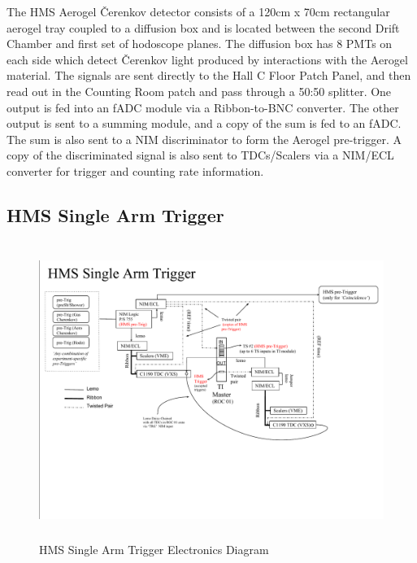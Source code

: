 \documentclass[11pt]{article}
\begin{document}
\indent The HMS Aerogel \v{C}erenkov detector consists of a 120cm x 70cm rectangular aerogel tray coupled to a diffusion box\cite{hms_aero_article} and is located
between the second Drift Chamber and first set of hodoscope planes. The diffusion box has 8 PMTs on each side
which detect \v{C}erenkov light produced by interactions with the Aerogel material. The signals are sent directly to the Hall C Floor Patch Panel, and then
read out in the Counting Room patch and pass through a 50:50 splitter. One output is fed into an fADC module via a Ribbon-to-BNC converter. The other output is
sent to a summing module, and a copy of the sum is fed to an fADC. The sum is also sent to a NIM discriminator to form the Aerogel pre-trigger.
A copy of the discriminated signal is also sent to TDCs/Scalers via a NIM/ECL converter for trigger and counting rate information.

\subsection{HMS Single Arm Trigger}\label{ssec:hms_single_arm_sec}
\begin{figure}[h!]
  \centering
  \includegraphics[width=7.0in, height=3.8in]{HMS_SingleArm_Trigger.pdf}
  \caption{HMS Single Arm Trigger Electronics Diagram}
  \label{fig:hms_one_arm_trg}
\end{figure}
\end{document}
